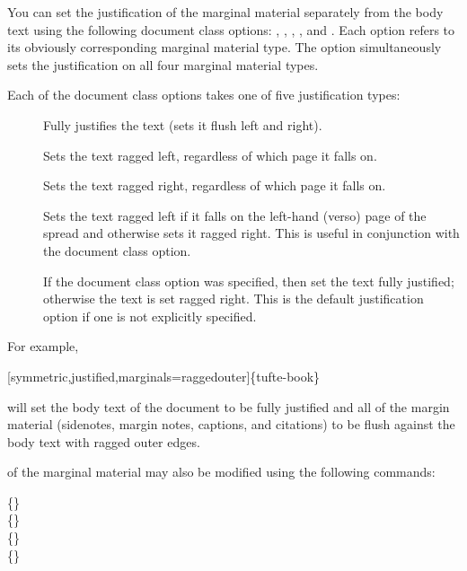 You can set the justification of the marginal material separately from the body
text using the following document class options: ,
, , , and
.  Each option refers to its obviously corresponding
marginal material type.  The  option simultaneously sets
the justification on all four marginal material types.

Each of the document class options takes one of five justification types:
\begin{description}
  \item[] Fully justifies the text (sets it flush left and
    right).
  \item[] Sets the text ragged left, regardless of which
    page it falls on.
  \item[] Sets the text ragged right, regardless of
    which page it falls on.
  \item[] Sets the text ragged left if it falls on the
    left-hand (verso) page of the spread and otherwise sets it ragged right.
    This is useful in conjunction with the  document class
    option.
  \item[] If the  document class option
    was specified, then set the text fully justified; otherwise the text is set
    ragged right.  This is the default justification option if one is not
    explicitly specified.
\end{description}

\noindent For example, 
\begin{docspec}
  [symmetric,justified,marginals=raggedouter]\{tufte-book\}
\end{docspec}
will set the body text of the document to be fully justified and all of the
margin material (sidenotes, margin notes, captions, and citations) to be flush
against the body text with ragged outer edges.

 of the marginal material may also be modified using the following commands:

\begin{docspec}
  \{\}\\
  \{\}\\
  \{\}\\
  \{\}
\end{docspec}

